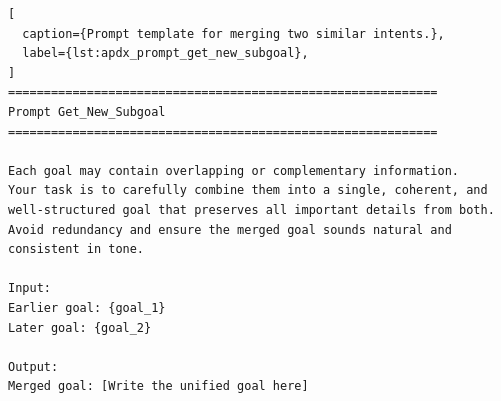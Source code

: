 \begin{lstlisting}[
  caption={Prompt template for merging two similar intents.},
  label={lst:apdx_prompt_get_new_subgoal},
]
============================================================
Prompt Get_New_Subgoal
============================================================

Each goal may contain overlapping or complementary information.
Your task is to carefully combine them into a single, coherent, and well-structured goal that preserves all important details from both.
Avoid redundancy and ensure the merged goal sounds natural and consistent in tone.

Input:
Earlier goal: {goal_1}
Later goal: {goal_2}

Output:
Merged goal: [Write the unified goal here]
\end{lstlisting}

